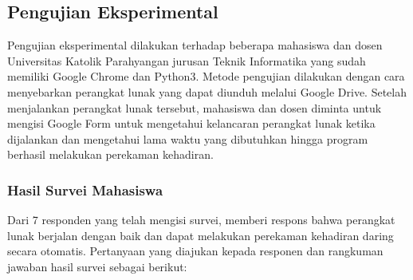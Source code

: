 \subsection{Pengujian Eksperimental}
Pengujian eksperimental dilakukan terhadap beberapa mahasiswa dan dosen Universitas Katolik Parahyangan jurusan Teknik Informatika yang sudah memiliki Google Chrome dan Python3. Metode pengujian dilakukan dengan cara menyebarkan perangkat lunak yang dapat diunduh melalui Google Drive. Setelah menjalankan perangkat lunak tersebut, mahasiswa dan dosen diminta untuk mengisi Google Form untuk mengetahui kelancaran perangkat lunak ketika dijalankan dan mengetahui lama waktu yang dibutuhkan hingga program berhasil melakukan perekaman kehadiran. 

\subsubsection{Hasil Survei Mahasiswa}
Dari 7 responden yang telah mengisi survei, memberi respons bahwa perangkat lunak berjalan dengan baik dan dapat melakukan perekaman kehadiran daring secara otomatis. Pertanyaan yang diajukan kepada responen dan rangkuman jawaban hasil survei sebagai berikut:
